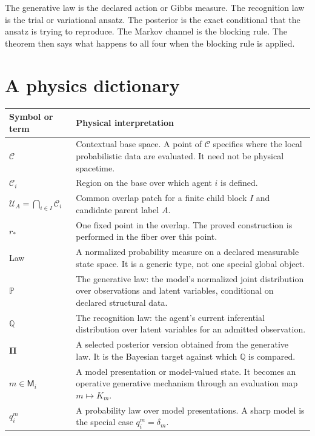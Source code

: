 \documentclass[11pt,letterpaper]{article}
\newcommand{\Prob}{\mathbb P}
\newcommand{\Rec}{\mathbb Q}
\newcommand{\Post}{\boldsymbol\Pi}
\begin{document}
\begin{translationbox}
The generative law is the declared action or Gibbs measure. The recognition law is the trial or variational ansatz. The posterior is the exact conditional that the ansatz is trying to reproduce. The Markov channel is the blocking rule. The theorem then says what happens to all four when the blocking rule is applied.
\end{translationbox}

\section{A physics dictionary}

\begin{table}[ht]
\centering
\small
\begin{tabularx}{\textwidth}{>{\raggedright\arraybackslash}p{}X}
\toprule
\textbf{Symbol or term} & \textbf{Physical interpretation} \\
\midrule
\(\mathcal C\) & Contextual base space. A point of \(\mathcal C\) specifies where the local probabilistic data are evaluated. It need not be physical spacetime. \\
\(\mathcal C_i\) & Region on the base over which agent \(i\) is defined. \\
\(\mathcal U_A=\bigcap_{i\in I}\mathcal C_i\) & Common overlap patch for a finite child block \(I\) and candidate parent label \(A\). \\
\(r_*\) & One fixed point in the overlap. The proved construction is performed in the fiber over this point. \\
Law & A normalized probability measure on a declared measurable state space. It is a generic type, not one special global object. \\
\(\Prob\) & The generative law: the model's normalized joint distribution over observations and latent variables, conditional on declared structural data. \\
\(\Rec\) & The recognition law: the agent's current inferential distribution over latent variables for an admitted observation. \\
\(\Post\) & A selected posterior version obtained from the generative law. It is the Bayesian target against which \(\Rec\) is compared. \\
\(m\in\mathsf M_i\) & A model presentation or model-valued state. It becomes an operative generative mechanism through an evaluation map \(m\mapsto K_m\). \\
\(q_i^m\) & A probability law over model presentations. A sharp model is the special case \(q_i^m=\delta_m\). \\

\end{tabularx}
\end{table}
\end{document}
